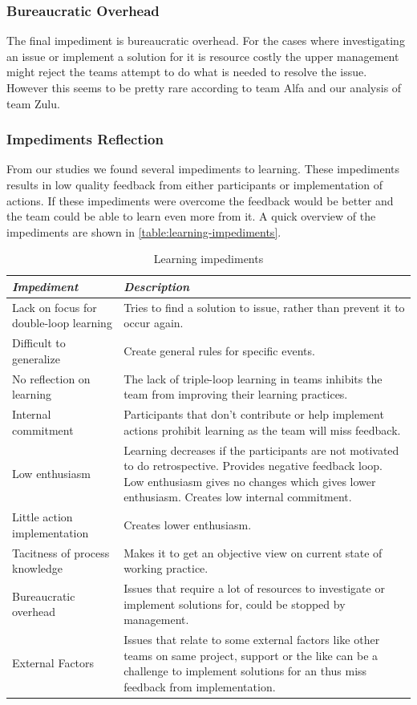 \subsubsection{Bureaucratic Overhead}
The final impediment is bureaucratic overhead. For the cases where investigating an issue or implement a solution for it is resource costly the upper management might reject the teams attempt to do what is needed to resolve the issue. However this seems to be pretty rare according to team Alfa and our analysis of team Zulu. 

\subsubsection{Impediments Reflection}
From our studies we found several impediments to learning. These impediments results in low quality feedback from either participants or implementation of actions. If these impediments were overcome the feedback would be better and the team could be able to learn even more from it. A quick overview of the impediments are shown in \autoref{table:learning-impediments}.

\begin{table}[h]
	\begin{center}
		\caption{Learning impediments}
		\label{table:learning-impediments}
		\begin{tabular}{p{} p{}}
			\hline
			\textit{Impediment} & \textit{Description} \\
			\hline
			Lack on focus for double-loop learning & Tries to find a solution to issue, rather than prevent it to occur again. \\
			Difficult to generalize & Create general rules for specific events. \\
			No reflection on learning & The lack of triple-loop learning in teams inhibits the team from improving their learning practices. \\
			Internal commitment & Participants that don't contribute or help implement actions prohibit learning as the team will miss feedback. \\ 
			Low enthusiasm & Learning decreases if the participants are not motivated to do retrospective. Provides negative feedback loop. Low enthusiasm gives no changes which gives lower enthusiasm. Creates low internal commitment. \\
			Little action implementation & Creates lower enthusiasm. \\
			Tacitness of process knowledge & Makes it to get an objective view on current state of working practice. \\
			Bureaucratic overhead & Issues that require a lot of resources to investigate or implement solutions for, could be stopped by management. \\
			External Factors & Issues that relate to some external factors like other teams on same project, support or the like can be a challenge to implement solutions for an thus miss feedback from implementation.\\
			\hline
		\end{tabular}
	\end{center}
\end{table}

